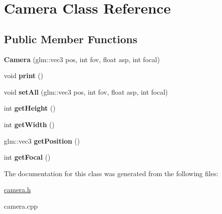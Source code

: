 \hypertarget{class_camera}{}\section{Camera Class Reference}
\label{class_camera}
\subsection*{Public Member Functions}
\begin{DoxyCompactItemize}
\item 
\mbox{\label{class_camera_a650299ece1e549c512df12164a5a0e9a}} 
{\bfseries Camera} (glm\+::vec3 pos, int fov, float asp, int focal)
\item 
\mbox{\label{class_camera_a905d2a0f8677aaad1ee17eb2a842efe5}} 
void {\bfseries print} ()
\item 
\mbox{\label{class_camera_a9c502622df46131c876f478693becf93}} 
void {\bfseries set\+All} (glm\+::vec3 pos, int fov, float asp, int focal)
\item 
\mbox{\label{class_camera_a315be9ee1238abddce9a580430ad403a}} 
int {\bfseries get\+Height} ()
\item 
\mbox{\label{class_camera_a1122b43b7db5e69e9d6e187b74a6ec7e}} 
int {\bfseries get\+Width} ()
\item 
\mbox{\label{class_camera_a520c5a7413b3e704f2f442288db17bcf}} 
glm\+::vec3 {\bfseries get\+Position} ()
\item 
\mbox{\label{class_camera_a5045b4557d3cd7cd4c64c49f5a693aa5}} 
int {\bfseries get\+Focal} ()
\end{DoxyCompactItemize}


The documentation for this class was generated from the following files\+:\begin{DoxyCompactItemize}
\item 
\mbox{\hyperlink{camera_8h}{camera.\+h}}\item 
camera.\+cpp\end{DoxyCompactItemize}
